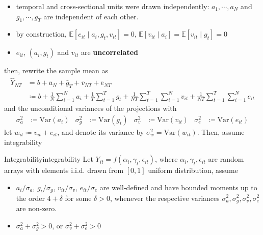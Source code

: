 \documentclass[twoside]{article}
\begin{document}
\begin{itemize}
    \item temporal and cross-sectional units were drawn independently: $a_1,\cdots,a_N$ and $g_1,\cdots,g_T$ are independent of each other.
    \item by construction, $\mathbb{E}\left[e_{it}\mid a_i,g_t,v_{it}\right]=0$, $\mathbb{E}\left[v_{it}\mid a_i\right] = \mathbb{E}\left[v_{it}\mid g_t\right]=0$
    \item $e_{it}$, $(a_i,g_t)$ and $v_{it}$ are \textbf{uncorrelated}
\end{itemize}
then, rewrite the sample mean as 
\begin{align*}
    \hat{Y}_{NT} &= b+\bar{a}_N + \bar{g}_T + \bar{v}_{NT} + \bar{e}_{NT}\\
    &\coloneq b + \frac{1}{N}\sum^N_{i=1}a_i + \frac{1}{T}\sum^T_{t=1}g_t + \frac{1}{NT}\sum^T_{t=1}\sum^N_{i=1}v_{it} + \frac{1}{NT}\sum^T_{t=1}\sum^N_{i=1}e_{it}
\end{align*}
and the unconditional variances of the projections with 
\begin{align*}
    \sigma^2_a&\coloneq \mathrm{Var}(a_i) & \sigma^2_g&\coloneq \mathrm{Var}(g_t) & \sigma^2_v&\coloneq \mathrm{Var}(v_{it}) & \sigma^2_e&\coloneq \mathrm{Var}(e_{it})   
\end{align*}
let $w_{it}\coloneq v_{it}+ e_{it}$, and denote its variance by $\sigma^2_w = \mathrm{Var}(w_{it})$. Then, assume integrability 
\begin{assumption}{Integrability}{integrability}
    Let $Y_{it} = f(\alpha_i,\gamma_t,\epsilon_{it})$, where $\alpha_i,\gamma_t,\epsilon_{it}$ are random arrays with elements i.i.d. drawn from $[0,1]$ uniform distribution, assume 
    \begin{itemize}
        \item $a_i/\sigma_a$, $g_t/\sigma_g$, $v_{it}/\sigma_v$, $e_{it}/\sigma_e$ are well-defined and have bounded moments up to the order $4+\delta$ for some $\delta>0$, whenever the respective variances $\sigma^2_a,\sigma^2_g,\sigma^2_v,\sigma^2_e$ are non-zero.
        \item $\sigma^2_a + \sigma^2_g >0$, or $\sigma^2_v + \sigma^2_e > 0$
    \end{itemize}
\end{assumption}
\end{document}
